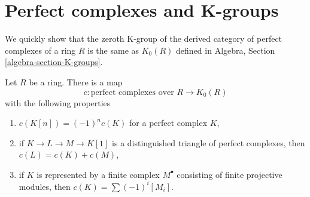 \section{Perfect complexes and K-groups}
\label{section-perfect-K-group}

\noindent
We quickly show that the zeroth K-group of the derived category of
perfect complexes of a ring $R$ is the same as $K_0(R)$ defined in
Algebra, Section \ref{algebra-section-K-groups}.

\begin{lemma}
\label{lemma-perfect-to-K-group}
Let $R$ be a ring. There is a map
$$
c : \text{perfect complexes over }R \longrightarrow K_0(R)
$$
with the following properties
\begin{enumerate}
\item $c(K[n]) = (-1)^nc(K)$ for a perfect complex $K$,
\item if $K \to L \to M \to K[1]$ is a distinguished triangle of
perfect complexes, then $c(L) = c(K) + c(M)$,
\item if $K$ is represented by a finite complex $M^\bullet$
consisting of finite projective modules, then
$c(K) = \sum (-1)^i[M_i]$.
\end{enumerate}
\end{lemma}

